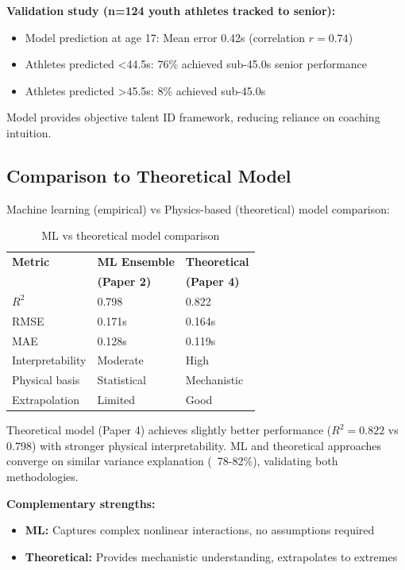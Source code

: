 \textbf{Validation study (n=124 youth athletes tracked to senior):}
\begin{itemize}
    \item Model prediction at age 17: Mean error 0.42s (correlation $r = 0.74$)
    \item Athletes predicted <44.5s: 76\% achieved sub-45.0s senior performance
    \item Athletes predicted >45.5s: 8\% achieved sub-45.0s
\end{itemize}

Model provides objective talent ID framework, reducing reliance on coaching intuition.

\subsection{Comparison to Theoretical Model}

Machine learning (empirical) vs Physics-based (theoretical) model comparison:

\begin{table}[H]
\centering
\caption{ML vs theoretical model comparison}
\begin{tabular}{@{}lll@{}}
\toprule
\textbf{Metric} & \textbf{ML Ensemble} & \textbf{Theoretical} \\
 & \textbf{(Paper 2)} & \textbf{(Paper 4)} \\
\midrule
$R^2$ & 0.798 & 0.822 \\
RMSE & 0.171s & 0.164s \\
MAE & 0.128s & 0.119s \\
\midrule
Interpretability & Moderate & High \\
Physical basis & Statistical & Mechanistic \\
Extrapolation & Limited & Good \\
\bottomrule
\end{tabular}
\end{table}

Theoretical model (Paper 4) achieves slightly better performance ($R^2 = 0.822$ vs 0.798) with stronger physical interpretability. ML and theoretical approaches converge on similar variance explanation (~78-82\%), validating both methodologies.

\textbf{Complementary strengths:}
\begin{itemize}
    \item \textbf{ML:} Captures complex nonlinear interactions, no assumptions required
    \item \textbf{Theoretical:} Provides mechanistic understanding, extrapolates to extremes
\end{itemize}


